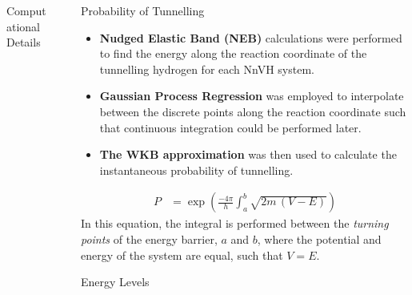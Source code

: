 \documentclass[final]{beamer}
\newlength{\sepwidth}
\newlength{\colwidth}
\newcommand{\separatorcolumn}{\begin{column}{\sepwidth}\end{column}}
\begin{document}
\begin{frame}[t]
\begin{columns}[t]
\begin{column}{\colwidth}
\begin{alertblock}{Computational Details}
  \end{alertblock}

\end{column}

\separatorcolumn

\begin{column}{\colwidth}

  \begin{block}{Probability of Tunnelling}

    \begin{itemize}
      \item \textbf{Nudged Elastic Band (NEB)} calculations were performed to find the energy along the reaction coordinate of the tunnelling hydrogen for each NnVH system.
      \item \textbf{Gaussian Process Regression} was employed to interpolate between the discrete points along the reaction coordinate such that continuous integration could be performed later.
      \item \textbf{The WKB approximation} was then used to calculate the instantaneous probability of tunnelling.  
    \end{itemize}
    \begin{align*}        
        P &= \exp \left(\frac{-4\pi}{h}\int_a^b \sqrt{2m\,(V-E)}  \right)
    \end{align*}
    In this equation, the integral is performed between the \emph{turning points} of the energy barrier, $a$ and $b$, where the potential and energy of the system are equal, such that $V = E$. 


  \end{block}

  \begin{block}{Energy Levels}


\end{block}
\end{column}
\end{columns}
\end{frame}
\end{document}

